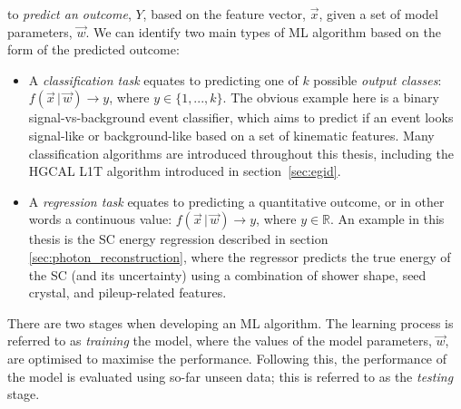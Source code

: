 \noindent
to \textit{predict an outcome}, $Y$, based on the feature vector, $\vec{x}$, given a set of model parameters, $\vec{w}$. We can identify two main types of ML algorithm based on the form of the predicted outcome:

\begin{itemize}
    \item A \textit{classification task} equates to predicting one of $k$ possible \textit{output classes}: $f(\vec{x}\,|\,\vec{w})\rightarrow y$, where $y\in \{1,...,k\}$. The obvious example here is a binary signal-vs-background event classifier, which aims to predict if an event looks signal-like or background-like based on a set of kinematic features. Many classification algorithms are introduced throughout this thesis, including the HGCAL L1T algorithm introduced in section~\ref{sec:egid}.
    
    \item A \textit{regression task} equates to predicting a quantitative outcome, or in other words a continuous value: $f(\vec{x}\,|\,\vec{w})\rightarrow y$, where $y\in \mathbb{R}$. An example in this thesis is the SC energy regression described in section \ref{sec:photon_reconstruction}, where the regressor predicts the true energy of the SC (and its uncertainty) using a combination of shower shape, seed crystal, and pileup-related features.
\end{itemize}

There are two stages when developing an ML algorithm. The learning process is referred to as \textit{training} the model, where the values of the model parameters, $\vec{w}$, are optimised to maximise the performance. Following this, the performance of the model is evaluated using so-far unseen data; this is referred to as the \textit{testing} stage.

